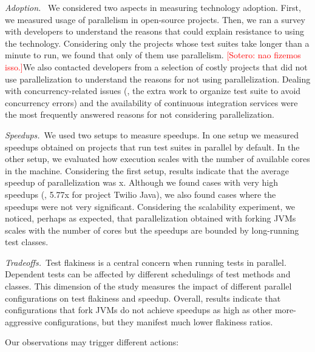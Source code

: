 \documentclass[10pt,journal,compsoc]{IEEEtran}
\begin{document}
\noindent\emph{Adoption.}~ We considered two aspects in measuring technology
adoption.  First, we measured usage of parallelism in open-source projects.
Then, we ran a survey with developers to understand the reasons that could
explain resistance to using the technology.
Considering only the projects whose test suites take longer than a minute to
run, we found that only \percentParallelUpdated{} of them use parallelism.  \textcolor{red}{[Sotero: nao fizemos isso.]}We
also contacted developers from a selection of costly projects that did not use
parallelization to understand the reasons for not using parallelization.
Dealing with concurrency-related issues (\eg{}, the extra work to organize test
suite to avoid concurrency errors) and the availability of continuous
integration services were the most frequently answered reasons for not
considering parallelization.

\noindent\emph{Speedups.}~We used two setups to measure speedups.  In one setup
we measured speedups obtained on projects that run test suites in parallel by
default.  In the other setup, we evaluated how execution scales with the number
of available cores in the machine.  Considering the first
setup, results indicate that the average speedup of parallelization was
\avgSpeedup{}x.  Although we found cases with very high speedups (\eg{}, 5.77x
for project Twilio Java), we also found cases where the speedups were not very
significant.  Considering the scalability experiment, we noticed, perhaps as
expected, that parallelization obtained with forking JVMs scales with the number
of cores but the speedups are bounded by long-running test classes.

\noindent\emph{Tradeoffs.}~Test flakiness is a central concern when running
tests in parallel.  Dependent tests can be affected by different schedulings of
test methods and classes.  This dimension of the study measures the impact of
different parallel configurations on test flakiness and speedup.  Overall,
results indicate that configurations that fork JVMs do not achieve speedups as
high as other more-aggressive configurations, but they manifest much lower
flakiness ratios.

Our observations may trigger different actions:
\end{document}
